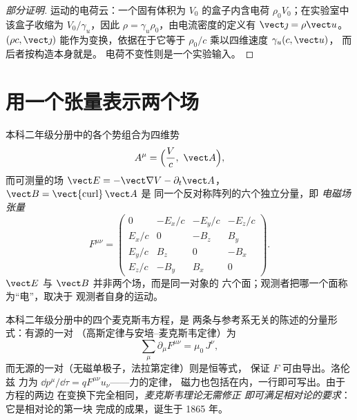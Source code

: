 \begin{proof}[部分证明]
运动的电荷云：一个固有体积为 $V_0$ 的盒子内含电荷 $\rho_0
V_0$；在实验室中该盒子收缩为 $V_0/\gamma_u$，因此 $\rho =
\gamma_u\rho_0$，由电流密度的定义有 $\vect\jmath = \rho\vect u$。
$(\rho c, \vect\jmath)$ 能作为变换，依据在于它等于
$\rho_0/c$ 乘以四维速度 $\gamma_u(c, \vect u)$，
而后者按构造本身就是。
电荷不变性则是一个实验输入。
\end{proof}

\section{用一个张量表示两个场}

\begin{definition}[四维势与电磁场张量]\label{def:b3:covariant-electromagnetism:tensor}
本科二年级分册中的各个势组合为四维势
\[
A^\mu = \Big(\frac{V}{c},\ \vect A\Big) ,
\]
而可测量的场 $\vect E = -\vect\nabla V -
\partial_t\vect A$，$\vect B = \operatorname{\vect{curl}}\vect A$ 是
同一个反对称阵列的六个独立分量，即
\emph{电磁场张量}
\[
F^{\mu\nu} =
\begin{pmatrix}
0 & -E_x/c & -E_y/c & -E_z/c\\
E_x/c & 0 & -B_z & B_y\\
E_y/c & B_z & 0 & -B_x\\
E_z/c & -B_y & B_x & 0
\end{pmatrix} .
\]
$\vect E$ 与 $\vect B$ 并非两个场，而是同一对象的
六个面；观测者把哪一个面称为“电”，取决于
观测者自身的运动。
\end{definition}

\begin{theorem}[麦克斯韦方程组的协变形式]\label{thm:b3:covariant-electromagnetism:maxwell}
本科二年级分册中的四个麦克斯韦方程，是
两条与参考系无关的陈述的分量形式：有源的一对
（高斯定律与安培–麦克斯韦定律）为
\[
\sum_\mu \partial_\mu F^{\mu\nu} = \mu_0\,J^\nu ,
\]
而无源的一对（无磁单极子，法拉第定律）则是恒等式，
保证 $F$ 可由导出。洛伦兹
力为 $\dd p^\mu/\dd\tau = qF^{\mu\nu}u_\nu$——力的定律，
磁力也包括在内，一行即可写出。由于方程的两边
在变换下完全相同，\emph{麦克斯韦理论无需修正
即可满足相对论的要求}：它是相对论的第一块
完成的成果，诞生于 1865 年。
\end{theorem}

